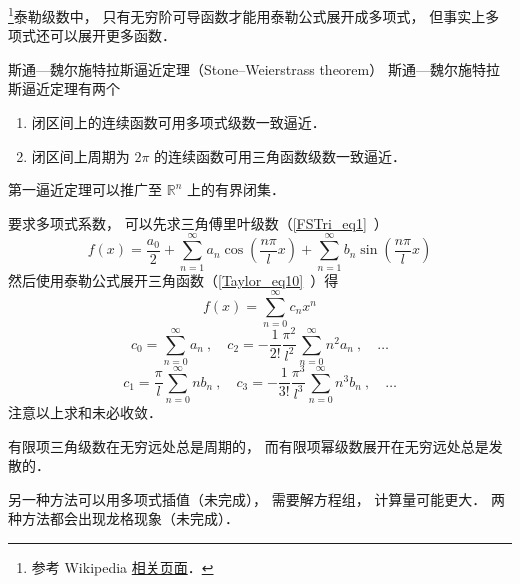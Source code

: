 \begin{issues}
\issueDraft
\end{issues}


\footnote{参考 Wikipedia \href{https://en.wikipedia.org/wiki/Stone–Weierstrass theorem}{相关页面}．}泰勒级数中， 只有无穷阶可导函数才能用泰勒公式展开成多项式， 但事实上多项式还可以展开更多函数．

\begin{theorem}{斯通—魏尔施特拉斯逼近定理（Stone–Weierstrass theorem）}
斯通—魏尔施特拉斯逼近定理有两个
\begin{enumerate}
\item 闭区间上的连续函数可用多项式级数一致逼近．
\item 闭区间上周期为 $2\pi$ 的连续函数可用三角函数级数一致逼近．
\end{enumerate}
第一逼近定理可以推广至 $\mathbb {R}^{n}$ 上的有界闭集．
\end{theorem}

要求多项式系数， 可以先求三角傅里叶级数（\autoref{FSTri_eq1}~）
\begin{equation}
f(x) = \frac{a_0}{2} + \sum_{n = 1}^\infty a_n \cos (\frac{n\pi}{l}x) + \sum_{n = 1}^\infty b_n \sin (\frac{n\pi}{l}x)
\end{equation}
然后使用泰勒公式展开三角函数（\autoref{Taylor_eq10}~）得
\begin{equation}
f(x) = \sum_{n=0}^\infty c_n x^n
\end{equation}
\begin{equation}
c_0 = \sum_{n=0}^\infty a_n~,
\quad
c_2 = -\frac{1}{2!}\frac{\pi^2}{l^2} \sum_{n=0}^\infty n^2 a_n~, \quad \dots
\end{equation}
\begin{equation}
c_1 = \frac{\pi}{l} \sum_{n=0}^\infty n b_n~,
\quad
c_3 = -\frac{1}{3!}\frac{\pi^3}{l^3} \sum_{n=0}^\infty n^3 b_n~, \quad \dots
\end{equation}
注意以上求和未必收敛．

有限项三角级数在无穷远处总是周期的， 而有限项幂级数展开在无穷远处总是发散的．

另一种方法可以用多项式插值（未完成）， 需要解方程组， 计算量可能更大． 两种方法都会出现龙格现象（未完成）．
